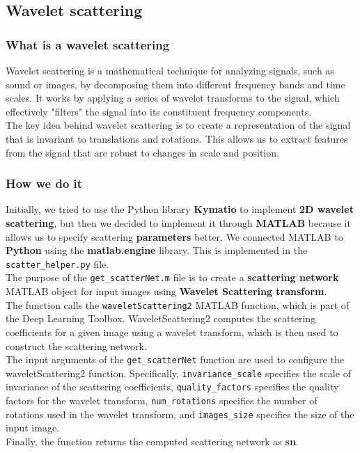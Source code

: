 \documentclass{report}
\begin{document}
\subsection{Wavelet scattering}
\subsubsection{What is a wavelet scattering}
Wavelet scattering is a mathematical technique for analyzing signals, such as sound or images, by decomposing them into different frequency bands and time scales. It works by applying a series of wavelet transforms to the signal, which effectively "filters" the signal into its constituent frequency components.\\
The key idea behind wavelet scattering is to create a representation of the signal that is invariant to translations and rotations. This allows us to extract features from the signal that are robust to changes in scale and position.
\subsubsection{How we do it}
Initially, we tried to use the Python library \textbf{Kymatio} to implement \textbf{2D wavelet scattering}, but then we decided to implement 
it through \textbf{MATLAB} because it allows us to specify scattering \textbf{parameters} better. We connected MATLAB to \textbf{Python} using 
the \textbf{matlab.engine} library. This is implemented in the \texttt{scatter\_helper.py} file.\\

The purpose of the \texttt{get\_scatterNet.m} file is to create a \textbf{scattering network} MATLAB object for input images using 
 \textbf{Wavelet Scattering transform}.\\
The function calls the \texttt{waveletScattering2} MATLAB function, which is part of the Deep Learning Toolbox. WaveletScattering2 computes the scattering coefficients for a given image using a wavelet transform, which is then used to construct the scattering network. \\
The input arguments of the \texttt{get\_scatterNet} function are used to configure the waveletScattering2 function. Specifically, \texttt{invariance\_scale} specifies the scale of invariance of the scattering coefficients, \texttt{quality\_factors} specifies the quality factors for the wavelet transform, \texttt{num\_rotations} specifies the number of rotations used in the wavelet transform, and \texttt{images\_size} specifies the size of the input image.\\
Finally, the function returns the computed scattering network as \textbf{sn}.\\
\end{document}
